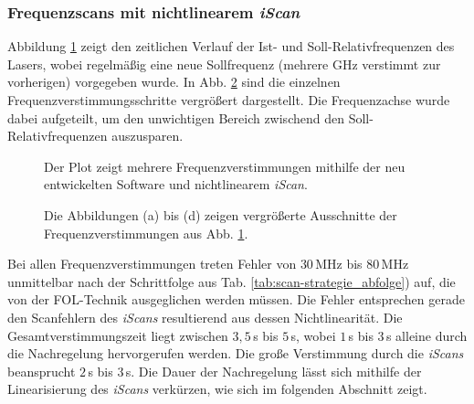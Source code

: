 \subsubsection{Frequenzscans mit nichtlinearem
\textit{iScan}}\label{subsubsec:frequenz_scans_nichtlineares_iScan}
Abbildung \ref{fig:laserscan_LUT-reset} zeigt den zeitlichen Verlauf der
Ist- und Soll-Relativfrequenzen des Lasers, wobei regelmäßig eine neue
Sollfrequenz (mehrere GHz verstimmt zur vorherigen) vorgegeben
wurde. In Abb. \ref{fig:laserscan_LUT-reset_zoom} sind die einzelnen
Frequenzverstimmungsschritte vergrößert dargestellt. Die Frequenzachse wurde
dabei aufgeteilt, um den unwichtigen Bereich zwischend den
Soll-Relativfrequenzen auszusparen.
\begin{figure}[h]
	 	\centering
	 	\footnotesize
		
		\caption[Frequenzscan, nichtlineares \textit{iScan}]{Der Plot zeigt mehrere
		Frequenzverstimmungen mithilfe der neu entwickelten Software und nichtlinearem
		\textit{iScan}.}
		\label{fig:laserscan_LUT-reset}
\end{figure}
\begin{figure}[hp]
 	\centering
 	\footnotesize
	\caption[Frequenzscan, nichtlineares \textit{iScan}, vergrößert]{Die
	Abbildungen (a) bis (d) zeigen vergrößerte Ausschnitte der
	Frequenzverstimmungen aus Abb. \ref{fig:laserscan_LUT-reset}.}
	\label{fig:laserscan_LUT-reset_zoom}
\end{figure}
Bei allen Frequenzverstimmungen treten Fehler von $30\,$MHz
bis $80\,$MHz unmittelbar nach der Schrittfolge aus Tab.
\ref{tab:scan-strategie_abfolge}) auf, die von der FOL-Technik ausgeglichen
werden müssen. Die Fehler entsprechen gerade den Scanfehlern des \textit{iScans}
resultierend aus dessen Nichtlinearität. Die Gesamtverstimmungszeit liegt
zwischen $3,5\,$s bis $5\,$s, wobei $1\,$s bis $3\,$s alleine durch die Nachregelung
hervorgerufen werden. Die große Verstimmung durch die \textit{iScans}
beansprucht $2\,$s bis $3\,$s. Die Dauer der Nachregelung lässt sich mithilfe
der Linearisierung des \textit{iScans} verkürzen, wie sich im folgenden Abschnitt zeigt.

